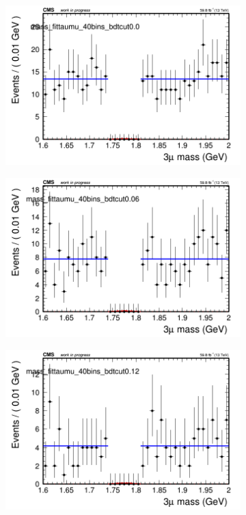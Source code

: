 \begin{figure}[H]
    \centering
    \begin{subfigure}{0.2\textwidth}
        \includegraphics[width=\textwidth]{flat_fit/plots/taumu/massfit_taumu_40bins_bdtcut0.0.png}
        \caption{}
    \end{subfigure}
    \begin{subfigure}{0.2\textwidth}
        \includegraphics[width=\textwidth]{flat_fit/plots/taumu/massfit_taumu_40bins_bdtcut0.06.png}
        \caption{}
    \end{subfigure}
    \begin{subfigure}{0.2\textwidth}
        \includegraphics[width=\textwidth]{flat_fit/plots/taumu/massfit_taumu_40bins_bdtcut0.12.png}

\end{subfigure}
\end{figure}
